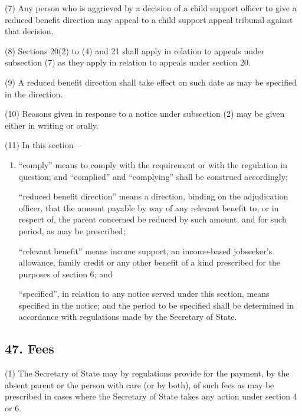 \documentclass[12pt,a4paper]{article}
\begin{document}
(7) Any person who is aggrieved by a decision of a child support officer to give a reduced benefit direction may appeal to a child support appeal tribunal against that decision.

(8) Sections 20(2)  to (4)  and 21 shall apply in relation to appeals under subsection (7)  as they apply in relation to appeals under section 20.

(9) A reduced benefit direction shall take effect on such date as may be specified in the direction.

(10) Reasons given in response to a notice under subsection (2)  may be given either in writing or orally.

(11) In this section—
\begin{enumerate}\item[]
    “comply” means to comply with the requirement or with the regulation in question; and “complied” and “complying” shall be construed accordingly;

    “reduced benefit direction” means a direction, binding on the adjudication officer, that the amount payable by way of any relevant benefit to, or in respect of, the parent concerned be reduced by such amount, and for such period, as may be prescribed;

    “relevant benefit” means income support, 
an income-based jobseeker’s allowance,  %
family credit or any other benefit of a kind prescribed for the purposes of section 6; and

    “specified”, in relation to any notice served under this section, means specified in the notice; and the period to be specified shall be determined in accordance with regulations made by the Secretary of State. 
\end{enumerate}


\subsection{47. Fees}

(1) The Secretary of State may by regulations provide for the payment, by the absent parent or the person with care (or by both), of such fees as may be prescribed in cases where the Secretary of State takes any action under section 4 or 6.
\end{document}
